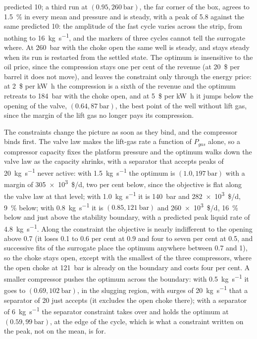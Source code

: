 \documentclass[a4paper,fleqn]{cas-sc}
\begin{document}
predicted 10; a third run at $(0.95, \SI{260}{\bar})$, the far corner of the box, agrees to \SI{1.5}{\percent} in every mean and pressure and is steady, with a peak of 5.8 against the same predicted 10: the amplitude of the fast cycle varies across the strip, from nothing to \SI{16}{\kilogram\per\second}, and the markers of three cycles cannot tell the surrogate where. At \SI{260}{\bar} with the choke open the same well is steady, and stays steady when its run is restarted from the settled state. The optimum is insensitive to the oil price, since the compression stays one per cent of the revenue (at \SI{20}{\$} per barrel it does not move), and leaves the constraint only through the energy price: at \SI{2}{\$} per \si{\kilo\watt\hour} the compression is a sixth of the revenue and the optimum retreats to \SI{184}{\bar} with the choke open, and at \SI{5}{\$} per \si{\kilo\watt\hour} it jumps below the opening of the valve, $(0.64, \SI{87}{\bar})$, the best point of the well without lift gas, since the margin of the lift gas no longer pays its compression.

The constraints change the picture as soon as they bind, and the compressor binds first. The valve law makes the lift-gas rate a function of $P_{gas}$ alone, so a compressor capacity fixes the platform pressure and the optimum walks down the valve law as the capacity shrinks, with a separator that accepts peaks of \SI{20}{\kilogram\per\second} never active: with \SI{1.5}{\kilogram\per\second} the optimum is $(1.0, \SI{197}{\bar})$ with a margin of \num{305e3}~\$/d, two per cent below, since the objective is flat along the valve law at that level; with \SI{1.0}{\kilogram\per\second} it is \SI{140}{\bar} and \num{282e3}~\$/d, \SI{9}{\percent} below; with \SI{0.8}{\kilogram\per\second} it is $(0.85, \SI{121}{\bar})$ and \num{260e3}~\$/d, \SI{16}{\percent} below and just above the stability boundary, with a predicted peak liquid rate of \SI{4.8}{\kilogram\per\second}. Along the constraint the objective is nearly indifferent to the opening above 0.7 (it loses 0.1 to 0.6 per cent at 0.9 and four to seven per cent at 0.5, and successive fits of the surrogate place the optimum anywhere between 0.7 and 1), so the choke stays open, except with the smallest of the three compressors, where the open choke at \SI{121}{\bar} is already on the boundary and costs four per cent. A smaller compressor pushes the optimum across the boundary: with \SI{0.5}{\kilogram\per\second} it goes to $(0.69, \SI{102}{\bar})$, in the slugging region, with surges of \SI{20}{\kilogram\per\second} that a separator of 20 just accepts (it excludes the open choke there); with a separator of \SI{6}{\kilogram\per\second} the separator constraint takes over and holds the optimum at $(0.59, \SI{99}{\bar})$, at the edge of the cycle, which is what a constraint written on the peak, not on the mean, is for.
\end{document}
